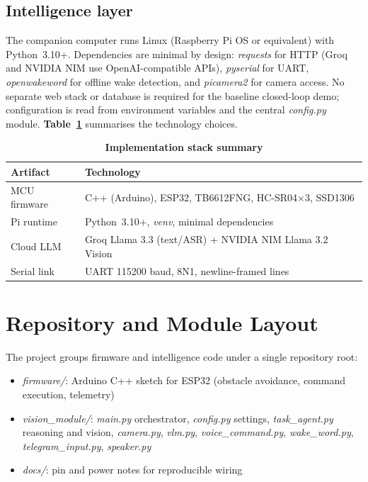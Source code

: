 \subsection{Intelligence layer}

The companion computer runs Linux (Raspberry Pi OS or equivalent) with Python~3.10+. Dependencies are minimal by design: \textit{requests} for HTTP (Groq and NVIDIA NIM use OpenAI-compatible APIs), \textit{pyserial} for UART, \textit{openwakeword} for offline wake detection, and \textit{picamera2} for camera access. No separate web stack or database is required for the baseline closed-loop demo; configuration is read from environment variables and the central \textit{config.py} module. \textbf{Table~\ref{tab:impl_stack}} summarises the technology choices.

\begin{table}[H]
\centering
\caption[Implementation stack summary]{\textbf{Implementation stack summary}}
\label{tab:impl_stack}
\begin{tabularx}{\textwidth}{|>{\raggedright\arraybackslash}p{3.0cm}|>{\raggedright\arraybackslash}X|}
\hline
\textbf{Artifact} & \textbf{Technology} \\
\hline
MCU firmware & C++ (Arduino), ESP32, TB6612FNG, HC-SR04$\times$3, SSD1306 \\
\hline
Pi runtime & Python~3.10+, \textit{venv}, minimal dependencies \\
\hline
Cloud LLM & Groq Llama 3.3 (text/ASR) + NVIDIA NIM Llama 3.2 Vision \\
\hline
Serial link & UART 115200 baud, 8N1, newline-framed lines \\
\hline
\end{tabularx}
\end{table}

\section{Repository and Module Layout}
\label{sec:repo}

The project groups firmware and intelligence code under a single repository root:

\begin{itemize}[nosep]
  \item \textit{firmware/}: Arduino C++ sketch for ESP32 (obstacle avoidance, command execution, telemetry)
  \item \textit{vision\_module/}: \textit{main.py} orchestrator, \textit{config.py} settings, \textit{task\_agent.py} reasoning and vision, \textit{camera.py}, \textit{vlm.py}, \textit{voice\_command.py}, \textit{wake\_word.py}, \textit{telegram\_input.py}, \textit{speaker.py}
  \item \textit{docs/}: pin and power notes for reproducible wiring
\end{itemize}

